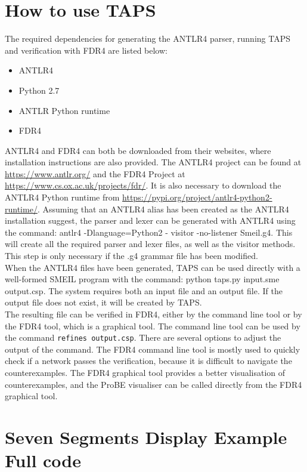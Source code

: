 \chapter{How to use TAPS}
The required dependencies for generating the ANTLR4 parser, running TAPS and verification with FDR4 are listed below:
\begin{itemize}
    \item ANTLR4
    \item Python 2.7
    \item ANTLR Python runtime
    \item FDR4
\end{itemize}

ANTLR4 and FDR4 can both be downloaded from their websites, where installation instructions are also provided.
The ANTLR4 project can be found at \url{https://www.antlr.org/} and the FDR4 Project at \url{https://www.cs.ox.ac.uk/projects/fdr/}.
It is also necessary to download the ANTLR4 Python runtime from \url{https://pypi.org/project/antlr4-python2-runtime/}.
Assuming that an ANTLR4 alias has been created as the ANTLR4 installation suggest, the parser and lexer can be generated with ANTLR4 using the command: {\ttfamily antlr4 -Dlanguage=Python2 - visitor -no-listener Smeil.g4.}
This will create all the required parser and lexer files, as well as the visitor methods. This step is only necessary if the .g4 grammar file has been modified.\\

When the ANTLR4 files have been generated, TAPS can be used directly with a well-formed SMEIL program with the command: {\ttfamily python taps.py input.sme output.csp}. The system requires both an input file and an output file. If the output file does not exist, it will be created by TAPS. \\

The resulting \cspm{} file can be verified in FDR4, either by the command line tool or by the FDR4 tool, which is a graphical tool. The command line tool can be used by the command \texttt{refines output.csp}. There are several options to adjust the output of the command. The FDR4 command line tool is mostly used to quickly check if a network passes the verification, because it is difficult to navigate the counterexamples. The FDR4 graphical tool provides a better visualisation of counterexamples, and the ProBE visualiser can be called directly from the FDR4 graphical tool.

\chapter{Seven Segments Display Example Full code}
\label{app:seven_segments}
